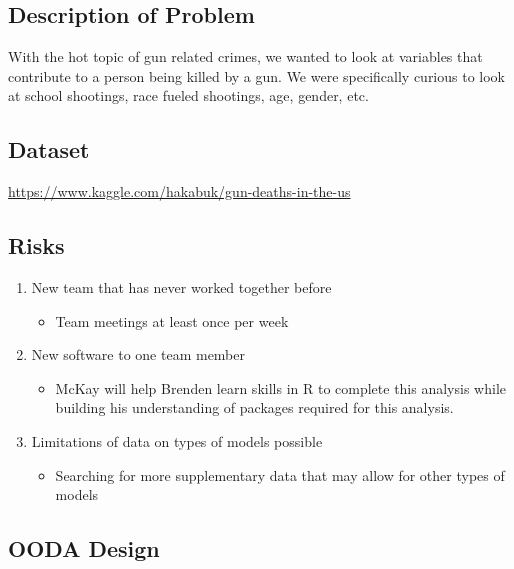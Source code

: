 \documentclass[]{article}
\providecommand{\tightlist}{%
  \setlength{\itemsep}{0pt}\setlength{\parskip}{0pt}}
\begin{document}
\hypertarget{description-of-problem}{%
\subsection{Description of Problem}\label{description-of-problem}}

With the hot topic of gun related crimes, we wanted to look at variables
that contribute to a person being killed by a gun. We were specifically
curious to look at school shootings, race fueled shootings, age, gender,
etc.

\hypertarget{dataset}{%
\subsection{Dataset}\label{dataset}}

\url{https://www.kaggle.com/hakabuk/gun-deaths-in-the-us}

\hypertarget{risks}{%
\subsection{Risks}\label{risks}}

\begin{enumerate}
\def\labelenumi{\arabic{enumi}.}
\tightlist
\item
  New team that has never worked together before

  \begin{itemize}
  \tightlist
  \item
    Team meetings at least once per week
  \end{itemize}
\item
  New software to one team member

  \begin{itemize}
  \tightlist
  \item
    McKay will help Brenden learn skills in R to complete this analysis
    while building his understanding of packages required for this
    analysis.
  \end{itemize}
\item
  Limitations of data on types of models possible

  \begin{itemize}
  \tightlist
  \item
    Searching for more supplementary data that may allow for other types
    of models
  \end{itemize}
\end{enumerate}

\hypertarget{ooda-design}{%
\subsection{OODA Design}\label{ooda-design}}
\end{document}
